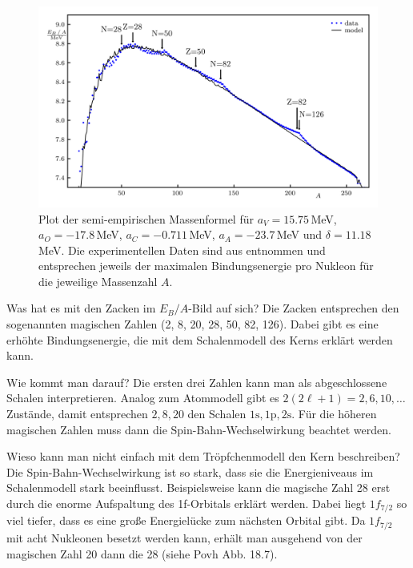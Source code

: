 \begin{figure}[!ht]
    \centering
    \includegraphics{img/experimental-mass-binding-model2.png}
    \caption{Plot der semi-empirischen Massenformel für $a_V = 15.75\,$MeV, $a_O = -17.8\,$MeV, $a_C = -0.711\,$MeV, $a_A = -23.7\,$MeV und $\delta = 11.18\,$MeV.
    Die experimentellen Daten sind aus \cite{WanAudKonHuaNaiXu2016} entnommen und entsprechen jeweils der maximalen Bindungsenergie pro Nukleon für die jeweilige Massenzahl $A$. }
    \label{fig:experimental-mass-binding-model}
\end{figure}

\begin{fquestion}{Was hat es mit den Zacken im $E_B / A$-Bild auf sich?}
    Die Zacken entsprechen den sogenannten magischen Zahlen (2, 8, 20, 28, 50, 82, 126).
    Dabei gibt es eine erhöhte Bindungsenergie, die mit dem Schalenmodell des Kerns erklärt werden kann.
\end{fquestion}

\begin{fquestion}{Wie kommt man darauf?}
    Die ersten drei Zahlen kann man als abgeschlossene Schalen interpretieren.
    Analog zum Atommodell gibt es $2(2\ell +1)=2,6,10,\dots$ Zustände, damit entsprechen $2,8,20$ den Schalen $1\mathrm{s},1\mathrm{p},2\mathrm{s}$.
    Für die höheren magischen Zahlen muss dann die Spin-Bahn-Wechselwirkung beachtet werden.
\end{fquestion}

\begin{fquestion}{Wieso kann man nicht einfach mit dem Tröpfchenmodell den Kern beschreiben? }
    Die Spin-Bahn-Wechselwirkung ist so stark, dass sie die Energieniveaus im Schalenmodell stark beeinflusst.
    Beispielsweise kann die magische Zahl 28 erst durch die enorme Aufspaltung des 1f-Orbitals erklärt werden.
    Dabei liegt $1f_{7/2}$ so viel tiefer, dass es eine große Energielücke zum nächsten Orbital gibt. 
    Da $1f_{7/2}$ mit acht Nukleonen besetzt werden kann, erhält man ausgehend von der magischen Zahl 20 dann die 28 (siehe Povh Abb. 18.7).
\end{fquestion}

